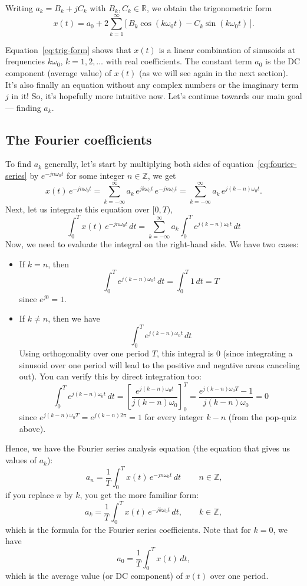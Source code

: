 \documentclass{ee102_notes}
\begin{document}
Writing $a_k=B_k+jC_k$ with $B_k,C_k\in\mathbb{R}$, we obtain the trigonometric form
\begin{equation}
\,x(t)=a_0+2\sum_{k=1}^{\infty}\!\big[\,B_k\cos(k\omega_0 t)-C_k\sin(k\omega_0 t)\,\big].\,
\label{eq:trig-form}
\end{equation}

Equation~\eqref{eq:trig-form} shows that $x(t)$ is a linear combination of sinusoids at frequencies $k\omega_0$, $k=1,2,\ldots$ with real coefficients. The constant term $a_0$ is the DC component (average value) of $x(t)$ (as we will see again in the next section). It's also finally an equation without any complex numbers or the imaginary term $j$ in it! So, it's hopefully more intuitive now. Let's continue towards our main goal --- finding $a_k$.

\subsection{The Fourier coefficients}
To find $a_k$ generally, let's start by multiplying both sides of equation~\eqref{eq:fourier-series} by $e^{-jn\omega_0 t}$ for some integer $n \in \mathbb{Z}$, we get
\[
x(t)\,e^{-jn\omega_0 t}
=\sum_{k=-\infty}^{\infty} a_k\,e^{jk\omega_0 t}\,e^{-jn\omega_0 t}
=\sum_{k=-\infty}^{\infty} a_k\,e^{j(k-n)\omega_0 t}.
\]
Next, let us integrate this equation over $[0,T)$,
\[
\int_{0}^{T} x(t)\,e^{-jn\omega_0 t}\,dt
=\sum_{k=-\infty}^{\infty} a_k \int_{0}^{T} e^{j(k-n)\omega_0 t}\,dt
\]
Now, we need to evaluate the integral on the right-hand side. We have two cases:
\begin{itemize}
\item If $k=n$, then 
\[ \int_{0}^{T} e^{j(k-n)\omega_0 t}\,dt=\int_{0}^{T} 1\,dt=T\] since $e^{j0}=1$.

\item If $k\neq n$, then we have 
\[
\int_{0}^{T} e^{j(k-n)\omega_0 t}\,dt
\]
Using orthogonality over one period $T$, this integral is 0 (since integrating a sinusoid over one period will lead to the positive and negative areas canceling out). You can verify this by direct integration too:
\[
\int_{0}^{T} e^{j(k-n)\omega_0 t}\,dt
=\left[\frac{e^{j(k-n)\omega_0 t}}{j(k-n)\omega_0}\right]_{0}^{T}
=\frac{e^{j(k-n)\omega_0 T}-1}{j(k-n)\omega_0}=0
\]
since $e^{j(k-n)\omega_0 T}=e^{j(k-n)2\pi}=1$ for every integer $k-n$ (from the pop-quiz above).
\end{itemize}

Hence, we have the Fourier series analysis equation (the equation that gives us values of $a_k$):
\[
\,a_n=\frac{1}{T}\int_{0}^{T} x(t)\,e^{-jn\omega_0 t}\,dt\,
\qquad n\in\mathbb{Z},
\]
if you replace $n$ by $k$, you get the more familiar form:
\[
a_k=\frac{1}{T}\int_{0}^{T} x(t)\,e^{-jk\omega_0 t}\,dt,
\qquad k\in\mathbb{Z},
\]
which is the formula for the Fourier series coefficients.
Note that for $k=0$, we have
\[
a_0=\frac{1}{T}\int_{0}^{T} x(t)\,dt,
\]
which is the average value (or DC component) of $x(t)$ over one period.
\end{document}
